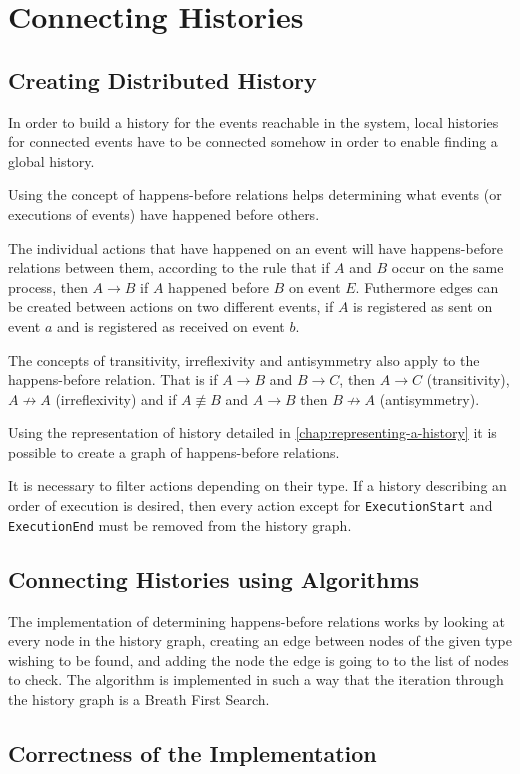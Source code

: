 \chapter{Connecting Histories} %
\label{chap:connecting-histories}
	\section{Creating Distributed  History} %
	In order to build a history for the events reachable in the system, local histories for connected events have to be connected somehow in order to enable finding a global history. 
	
	Using the concept of happens-before relations helps determining what events (or executions of events) have happened before others. 
	
	The individual actions that have happened on an event will have happens-before relations between them, according to the rule that if $A$ and $B$ occur on the same process, then $A \rightarrow B$ if $A$ happened before $B$ on event $E$. 
	Futhermore edges can be created between actions on two different events, if $A$ is registered as sent on event $a$ and is registered as received on event $b$.
	
	The concepts of transitivity, irreflexivity and antisymmetry also apply to the happens-before relation. That is if $A \rightarrow B$ and $B \rightarrow C$, then $A \rightarrow C$ (transitivity), $A \not\rightarrow A$ (irreflexivity) and if $A \not\equiv B$ and $A \rightarrow B$ then $B \not\rightarrow A$ (antisymmetry).
	
	Using the representation of history detailed in \ref{chap:representing-a-history} it is possible to create a graph of happens-before relations.
	
	
	It is necessary to filter actions depending on their type. If a history describing an order of execution is desired, then every action except for \texttt{ExecutionStart} and \texttt{ExecutionEnd} must be removed from the history graph. 
	
	\section{Connecting Histories using Algorithms} %
	The implementation of determining happens-before relations works by looking at every node in the history graph, creating an edge between nodes of the given type wishing to be found, and adding the node the edge is going to to the list of nodes to check. The algorithm is implemented in such a way that the iteration through the history graph is a Breath First Search. 
	
	\section{Correctness of the Implementation} %
	